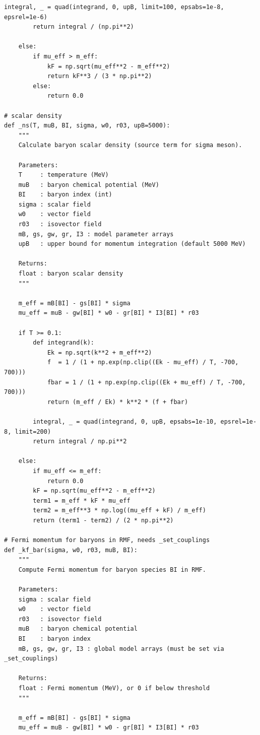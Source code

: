 \documentclass[12pt]{article}
\begin{document}
\begin{lstlisting}[style=mypython]
        integral, _ = quad(integrand, 0, upB, limit=100, epsabs=1e-8, epsrel=1e-6)
        return integral / (np.pi**2)

    else:
        if mu_eff > m_eff:
            kF = np.sqrt(mu_eff**2 - m_eff**2)
            return kF**3 / (3 * np.pi**2)
        else:
            return 0.0

# scalar density 
def _ns(T, muB, BI, sigma, w0, r03, upB=5000):
    """
    Calculate baryon scalar density (source term for sigma meson).

    Parameters:
    T     : temperature (MeV)
    muB   : baryon chemical potential (MeV)
    BI    : baryon index (int)
    sigma : scalar field
    w0    : vector field
    r03   : isovector field
    mB, gs, gw, gr, I3 : model parameter arrays
    upB   : upper bound for momentum integration (default 5000 MeV)

    Returns:
    float : baryon scalar density
    """

    m_eff = mB[BI] - gs[BI] * sigma
    mu_eff = muB - gw[BI] * w0 - gr[BI] * I3[BI] * r03

    if T >= 0.1:
        def integrand(k):
            Ek = np.sqrt(k**2 + m_eff**2)
            f  = 1 / (1 + np.exp(np.clip((Ek - mu_eff) / T, -700, 700)))
            fbar = 1 / (1 + np.exp(np.clip((Ek + mu_eff) / T, -700, 700)))
            return (m_eff / Ek) * k**2 * (f + fbar)

        integral, _ = quad(integrand, 0, upB, epsabs=1e-10, epsrel=1e-8, limit=200)
        return integral / np.pi**2

    else:
        if mu_eff <= m_eff:
            return 0.0
        kF = np.sqrt(mu_eff**2 - m_eff**2)
        term1 = m_eff * kF * mu_eff
        term2 = m_eff**3 * np.log((mu_eff + kF) / m_eff)
        return (term1 - term2) / (2 * np.pi**2)

# Fermi momentum for baryons in RMF, needs _set_couplings
def _kf_bar(sigma, w0, r03, muB, BI):
    """
    Compute Fermi momentum for baryon species BI in RMF.

    Parameters:
    sigma : scalar field
    w0    : vector field
    r03   : isovector field
    muB   : baryon chemical potential
    BI    : baryon index
    mB, gs, gw, gr, I3 : global model arrays (must be set via _set_couplings)

    Returns:
    float : Fermi momentum (MeV), or 0 if below threshold
    """

    m_eff = mB[BI] - gs[BI] * sigma
    mu_eff = muB - gw[BI] * w0 - gr[BI] * I3[BI] * r03


\end{lstlisting}
\end{document}
